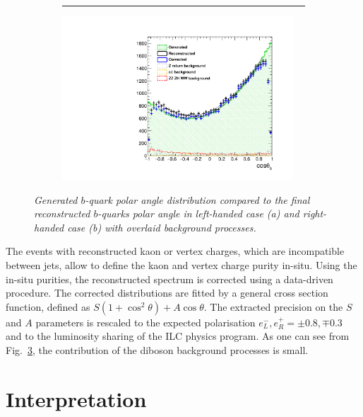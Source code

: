 \documentclass{PoS}
\begin{document}
\begin{figure}
\begin{subfigure}{0.5\textwidth}
{{				\rule{0ex}{0.51in}%
			}
			\rule{1.8in}{0ex}}
		\caption{\label{fig:BAsymmetryFinal_a_3} }
	\end{subfigure}%
	\begin{subfigure}{0.5\textwidth}
		\centering
		\includegraphics[width=0.95\textwidth]{../ILD/plots/basymmetry-final-right.pdf}
		\caption{\label{fig:BAsymmetryFinal_b_3} }
	\end{subfigure}
	\caption{\sl Generated $b$-quark polar angle distribution compared to the final reconstructed $b$-quarks polar angle in left-handed case (a) and right-handed case (b) with overlaid background processes.  }
	\label{fig:BAsymmetryFinal_3}
\end{figure}

The events with reconstructed kaon or vertex charges, which are incompatible between jets, allow to define the kaon and vertex charge purity in-situ.
Using the in-situ purities, the reconstructed spectrum is corrected using a data-driven procedure.
The corrected distributions are fitted by a general cross section function, defined as ${	S (1+\cos^2\theta) + A \cos\theta}$. The extracted precision on the $S$ and $A$ parameters is rescaled to the expected polarisation $e^-_L, e^+_R = \pm0.8, \mp0.3$ and to the luminosity sharing of the ILC physics program.
As one can see from Fig.~\ref{fig:BAsymmetryFinal_3}, the contribution of the diboson background processes is small. 

\section{Interpretation}
\end{document}
